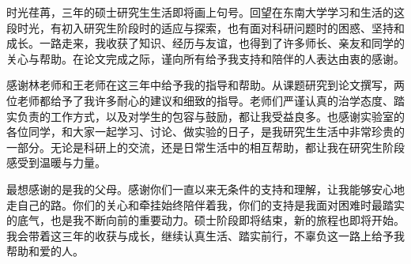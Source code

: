 \acknowledgement

时光荏苒，三年的硕士研究生生活即将画上句号。回望在东南大学学习和生活的这段时光，有初入研究生阶段时的适应与探索，也有面对科研问题时的困惑、坚持和成长。一路走来，我收获了知识、经历与友谊，也得到了许多师长、亲友和同学的关心与帮助。在论文完成之际，谨向所有给予我支持和陪伴的人表达由衷的感谢。

感谢林老师和王老师在这三年中给予我的指导和帮助。从课题研究到论文撰写，两位老师都给予了我许多耐心的建议和细致的指导。老师们严谨认真的治学态度、踏实负责的工作方式，以及对学生的包容与鼓励，都让我受益良多。也感谢实验室的各位同学，和大家一起学习、讨论、做实验的日子，是我研究生生活中非常珍贵的一部分。无论是科研上的交流，还是日常生活中的相互帮助，都让我在研究生阶段感受到温暖与力量。

最想感谢的是我的父母。感谢你们一直以来无条件的支持和理解，让我能够安心地走自己的路。你们的关心和牵挂始终陪伴着我，你们的支持是我面对困难时最踏实的底气，也是我不断向前的重要动力。硕士阶段即将结束，新的旅程也即将开始。我会带着这三年的收获与成长，继续认真生活、踏实前行，不辜负这一路上给予我帮助和爱的人。
